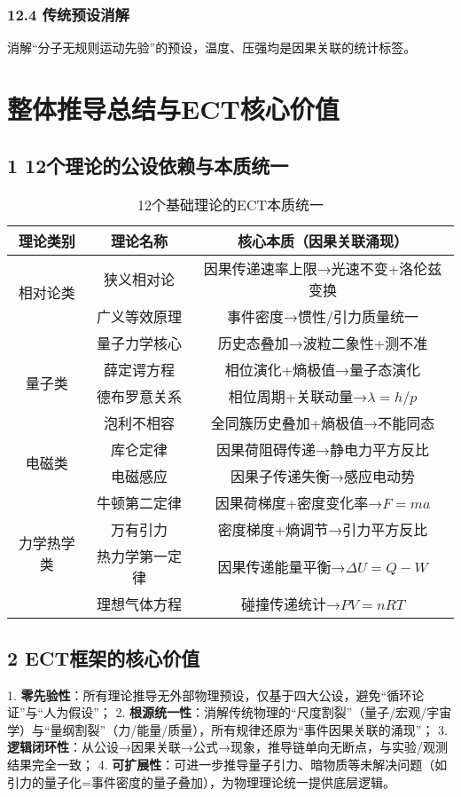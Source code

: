 \documentclass{article}
\begin{document}
\subsubsection{12.4 传统预设消解}
消解“分子无规则运动先验”的预设，温度、压强均是因果关联的统计标签。

\newpage

\section{整体推导总结与ECT核心价值}
\subsection{1 12个理论的公设依赖与本质统一}
\begin{table}[h]
\centering
\begin{tabular}{|c|c|c|}
\hline
理论类别 & 理论名称 & 核心本质（因果关联涌现） \\
\hline
\multirow{2}{*}{相对论类} & 狭义相对论 & 因果传递速率上限→光速不变+洛伦兹变换 \\
& 广义等效原理 & 事件密度→惯性/引力质量统一 \\
\hline
\multirow{4}{*}{量子类} & 量子力学核心 & 历史态叠加→波粒二象性+测不准 \\
& 薛定谔方程 & 相位演化+熵极值→量子态演化 \\
& 德布罗意关系 & 相位周期+关联动量→$\lambda = h/p$ \\
& 泡利不相容 & 全同簇历史叠加+熵极值→不能同态 \\
\hline
\multirow{2}{*}{电磁类} & 库仑定律 & 因果荷阻碍传递→静电力平方反比 \\
& 电磁感应 & 因果子传递失衡→感应电动势 \\
\hline
\multirow{4}{*}{力学热学类} & 牛顿第二定律 & 因果荷梯度+密度变化率→$F=ma$ \\
& 万有引力 & 密度梯度+熵调节→引力平方反比 \\
& 热力学第一定律 & 因果传递能量平衡→$\Delta U=Q-W$ \\
& 理想气体方程 & 碰撞传递统计→$PV=nRT$ \\
\hline
\end{tabular}
\caption{12个基础理论的ECT本质统一}
\end{table}

\subsection{2 ECT框架的核心价值}
1. \textbf{零先验性}：所有理论推导无外部物理预设，仅基于四大公设，避免“循环论证”与“人为假设”；  
2. \textbf{根源统一性}：消解传统物理的“尺度割裂”（量子/宏观/宇宙学）与“量纲割裂”（力/能量/质量），所有规律还原为“事件因果关联的涌现”；  
3. \textbf{逻辑闭环性}：从公设→因果关联→公式→现象，推导链单向无断点，与实验/观测结果完全一致；  
4. \textbf{可扩展性}：可进一步推导量子引力、暗物质等未解决问题（如引力的量子化=事件密度的量子叠加），为物理理论统一提供底层逻辑。
\end{document}
